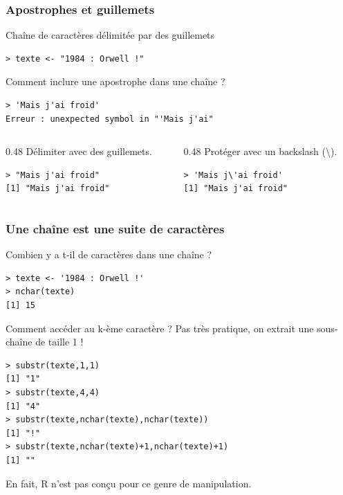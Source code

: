 \documentclass[10pt]{beamer}
\begin{document}
\begin{frame}[fragile]
  \frametitle{Apostrophes et guillemets}
\begin{block}{Chaîne de caractères délimitée par des guillemets}
  \begin{lstlisting}[style=edblock]
> texte <- "1984 : Orwell !"
  \end{lstlisting}
\end{block}

\begin{exampleblock}{Comment inclure une apostrophe dans une chaîne ?}
  \begin{lstlisting}[style=block]
> 'Mais j'ai froid'
Erreur : unexpected symbol in "'Mais j'ai"
\end{lstlisting}
\begin{columns}[t]
  \begin{column}{0.48\textwidth}
    Délimiter avec des guillemets.
  \begin{lstlisting}
> "Mais j'ai froid"
[1] "Mais j'ai froid"
\end{lstlisting}
\end{column}
\begin{column}{0.48\textwidth}
  Protéger avec un backslash (\textbackslash).
  \begin{lstlisting}
> 'Mais j\'ai froid'
[1] "Mais j'ai froid"
\end{lstlisting}
\end{column}
\end{columns}

\end{exampleblock}
\end{frame}


\begin{frame}[fragile]
  \frametitle{Une chaîne est une suite de caractères}
  \begin{block}{Combien y a t-il de caractères dans une chaîne ?}
    \begin{lstlisting}[style=block]
> texte <- '1984 : Orwell !'
> nchar(texte)
[1] 15
    \end{lstlisting}
  \end{block}

  \begin{block}{Comment accéder au k-ème caractère ?}
    Pas très pratique, on extrait une sous-chaîne de taille 1 !
    \begin{lstlisting}[style=block]
> substr(texte,1,1)
[1] "1"
> substr(texte,4,4)
[1] "4"
> substr(texte,nchar(texte),nchar(texte))
[1] "!"
> substr(texte,nchar(texte)+1,nchar(texte)+1)
[1] ""
    \end{lstlisting}
    En fait, R n’est pas conçu pour ce genre de manipulation.
  \end{block}
\end{frame}
\end{document}
